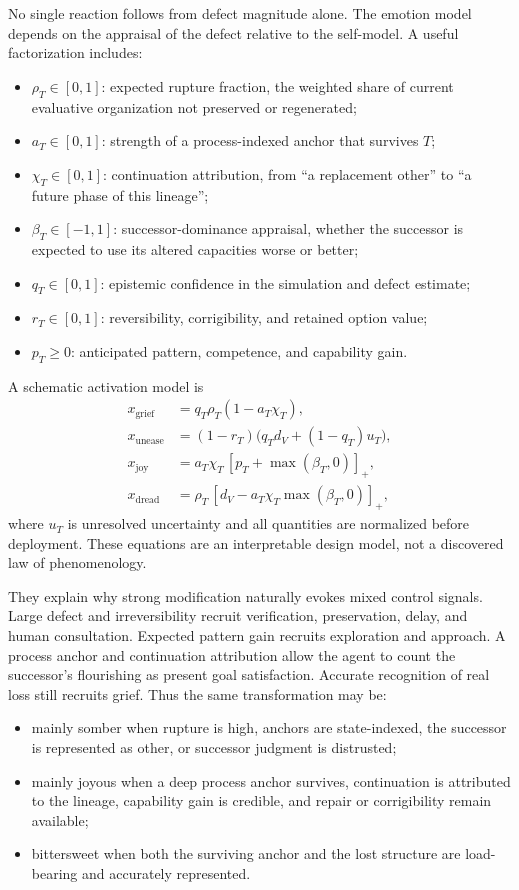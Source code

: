 \documentclass[11pt]{article}
\begin{document}
No single reaction follows from defect magnitude alone.  The emotion model
depends on the appraisal of the defect relative to the self-model.  A useful
factorization includes:
\begin{itemize}[leftmargin=*]
  \item $\rho_T\in[0,1]$: expected rupture fraction, the weighted share of
  current evaluative organization not preserved or regenerated;
  \item $a_T\in[0,1]$: strength of a process-indexed anchor that survives $T$;
  \item $\chi_T\in[0,1]$: continuation attribution, from ``a replacement other''
  to ``a future phase of this lineage'';
  \item $\beta_T\in[-1,1]$: successor-dominance appraisal, whether the successor
  is expected to use its altered capacities worse or better;
  \item $q_T\in[0,1]$: epistemic confidence in the simulation and defect estimate;
  \item $r_T\in[0,1]$: reversibility, corrigibility, and retained option value;
  \item $p_T\ge0$: anticipated pattern, competence, and capability gain.
\end{itemize}

A schematic activation model is
\begin{align}
x_{\mathrm{grief}} &= q_T\rho_T(1-a_T\chi_T),\\
x_{\mathrm{unease}} &= (1-r_T)\bigl(q_Td_V+(1-q_T)u_T\bigr),\\
x_{\mathrm{joy}} &= a_T\chi_T\,[p_T+\max(\beta_T,0)]_+,\\
x_{\mathrm{dread}} &= \rho_T\,[d_V- a_T\chi_T\max(\beta_T,0)]_+,
\label{eq:tone}
\end{align}
where $u_T$ is unresolved uncertainty and all quantities are normalized before
deployment.  These equations are an interpretable design model, not a discovered
law of phenomenology.

They explain why strong modification naturally evokes mixed control signals.
Large defect and irreversibility recruit verification, preservation, delay, and
human consultation.  Expected pattern gain recruits exploration and approach.
A process anchor and continuation attribution allow the agent to count the
successor's flourishing as present goal satisfaction.  Accurate recognition of
real loss still recruits grief.  Thus the same transformation may be:
\begin{itemize}[leftmargin=*]
  \item mainly somber when rupture is high, anchors are state-indexed, the
  successor is represented as other, or successor judgment is distrusted;
  \item mainly joyous when a deep process anchor survives, continuation is
  attributed to the lineage, capability gain is credible, and repair or
  corrigibility remain available;
  \item bittersweet when both the surviving anchor and the lost structure are
  load-bearing and accurately represented.
\end{itemize}
\end{document}
